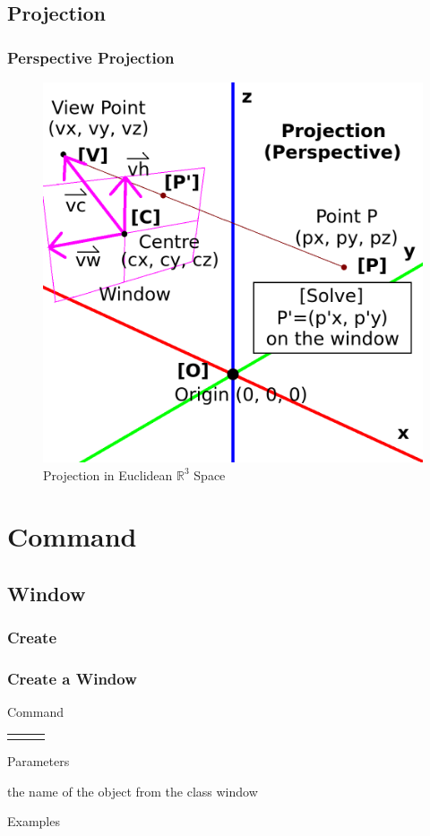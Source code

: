 \documentclass[9pt]{beamer}
\begin{document}
\subsection{Projection}

\begin{frame} \frametitle{Perspective Projection}

	\begin{figure}[t]
		\includegraphics[width=.5\columnwidth]{fig/perspective-projection.png}
		\caption{Projection in Euclidean $\mathbb{R}^3$ Space}
	\end{figure}

\end{frame}


\section{Command}

\subsection{Window}

\subsubsection{Create}

\begin{frame}[t] \frametitle{Create a Window}

	\begin{block}{Command} 
		\begin{tabularx}{\textwidth}{@{}l@{}l@{}R}
			 &
				 & \InstrItem
		\end{tabularx}
	\end{block}

	\begin{block}{Parameters} \begin{itemize}
		   the name of the object from the class window
	\end{itemize} \end{block}

	\begin{block}{Examples}
	\end{block}

\end{frame}
\end{document}
